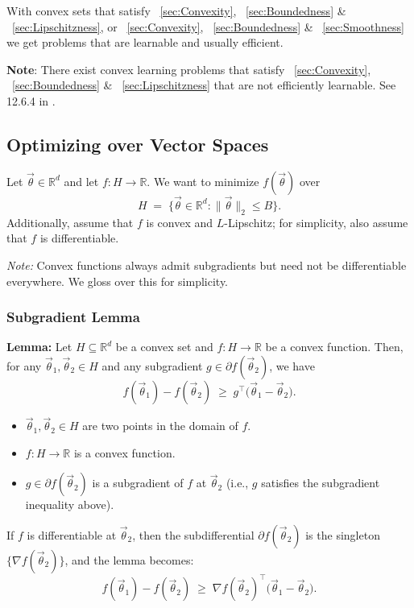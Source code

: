 \documentclass[11pt]{article}
\theoremstyle{plain}
\begin{document}
With convex sets that satisfy ~\ref{sec:Convexity}, ~\ref{sec:Boundedness} \& ~\ref{sec:Lipschitzness}, or  ~\ref{sec:Convexity}, ~\ref{sec:Boundedness} \& ~\ref{sec:Smoothness} we get problems that are learnable and usually efficient.

\noindent \textbf{Note}: There exist convex learning problems that satisfy
~\ref{sec:Convexity}, ~\ref{sec:Boundedness} \& ~\ref{sec:Lipschitzness} that
are not efficiently learnable. See 12.6.4 in \cite{ShalevShwartzUnderstandingML}.

\subsection{Optimizing over Vector Spaces}
Let $\vec{\theta}\in\mathbb{R}^d$ and let $f:H\to\mathbb{R}$. We want to minimize $f(\vec{\theta})$ over
\[
  H \;=\; \bigl\{\vec{\theta}\in\mathbb{R}^d : \lVert \vec{\theta}\rVert_2 \le B \bigr\}.
\]
Additionally, assume that $f$ is convex and $L$-Lipschitz; for simplicity, also assume that $f$ is differentiable.

\smallskip
\noindent\textit{Note:} Convex functions always admit subgradients but need not be differentiable everywhere. We gloss over this for simplicity.


\subsubsection{Subgradient Lemma}
\textbf{Lemma:}  
Let $H \subseteq \mathbb{R}^d$ be a convex set and $f : H \to \mathbb{R}$ be a convex function.  
Then, for any $\vec{\theta}_1, \vec{\theta}_2 \in H$ and any subgradient $g \in \partial f(\vec{\theta}_2)$, we have
\[
    f(\vec{\theta}_1) - f(\vec{\theta}_2) \;\ge\; g^\top \big(\vec{\theta}_1 - \vec{\theta}_2\big).
\]

\begin{itemize}
    \item $\vec{\theta}_1, \vec{\theta}_2 \in H$ are two points in the domain of $f$.
    \item $f : H \to \mathbb{R}$ is a convex function.
    \item $g \in \partial f(\vec{\theta}_2)$ is a subgradient of $f$ at $\vec{\theta}_2$ (i.e., $g$ satisfies the subgradient inequality above).
\end{itemize}

If $f$ is differentiable at $\vec{\theta}_2$, then the subdifferential $\partial f(\vec{\theta}_2)$ is the singleton $\{\nabla f(\vec{\theta}_2)\}$, and the lemma becomes:
\[
    f(\vec{\theta}_1) - f(\vec{\theta}_2) \;\ge\; \nabla f(\vec{\theta}_2)^\top \big(\vec{\theta}_1 - \vec{\theta}_2\big).
\]
\end{document}
